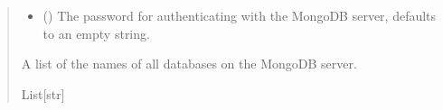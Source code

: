 \documentclass[letterpaper,10pt,english]{sphinxmanual}
\begin{document}
\begin{fulllineitems}
\begin{quote}
\begin{description}
\begin{itemize}
\item {} 
\sphinxAtStartPar
{} (\sphinxstyleliteralemphasis{\sphinxupquote{, }}) \textendash{} The password for authenticating with the MongoDB server, defaults to an empty string.

\end{itemize}

\sphinxAtStartPar
A list of the names of all databases on the MongoDB server.

\sphinxAtStartPar
List{[}str{]}

\end{description}\end{quote}

\end{fulllineitems}

\end{document}
